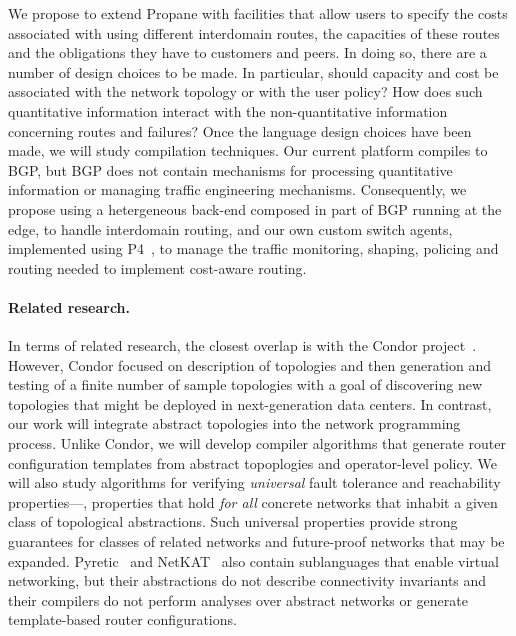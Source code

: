 We propose to extend Propane with facilities that allow users to specify the
costs associated with using different interdomain routes, the capacities of these
routes and the obligations they have to customers and peers.  In doing so, there
are a number of design choices to be made.  In particular, should capacity and cost
be associated with the network topology or with the user policy?  How does such
quantitative information interact with the non-quantitative information concerning
routes and failures?  Once the language design choices have been made, we will 
study compilation techniques.  Our current platform compiles to BGP, but BGP 
does not contain mechanisms for processing quantitative information or managing
traffic engineering mechanisms.  Consequently, we propose using a hetergeneous
back-end composed in part of BGP running at the edge, to handle interdomain
routing, and our own custom switch agents, implemented using P4~\cite{P4}, 
to manage the traffic monitoring, shaping, policing and routing needed to implement
cost-aware routing.  


\paragraph*{Related research.}
In terms of related research, the closest overlap is with the 
Condor project~\cite{condor}.  However, Condor focused on description
of topologies and then generation and testing of a finite number of
sample topologies with a goal of discovering new topologies that might be 
deployed in next-generation data centers.
In contrast, our work will integrate abstract topologies into the
network programming process. Unlike Condor,
we will develop
compiler algorithms that generate router configuration templates from
abstract topoplogies and operator-level policy.  We will also 
study algorithms for verifying \emph{universal}
fault tolerance and reachability properties---\ie, properties that
hold \emph{for all} concrete
networks that inhabit a given class of topological abstractions.  Such
universal properties provide strong guarantees for classes of
related networks and future-proof networks
that may be expanded.  
Pyretic~\cite{pyretic} and NetKAT~\cite{fast-compiler} also contain sublanguages
that enable virtual networking, but their abstractions do not describe
connectivity invariants and their compilers do not perform analyses over
abstract networks or generate template-based router configurations.

